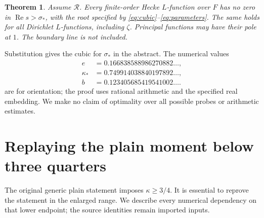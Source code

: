 \documentclass[11pt,a4paper]{article}
\newtheorem{theorem}{Theorem}[section]
\theoremstyle{definition}
\newcommand{\Rea}{\operatorname{Re}}
\newcommand{\sig}{\sigma_*}
\begin{document}
\begin{theorem}\label{thm:main}
Assume $\mathcal R$. Every finite-order Hecke $L$-function over $F$
has no zero in $\Rea s>\sig$, with the root specified by
\eqref{eq:cubic}--\eqref{eq:parameters}.
The same holds for all Dirichlet $L$-functions, including $\zeta$.
Principal functions may have their pole at $1$.
The boundary line is not included.
\end{theorem}

Substitution gives the cubic for $\sig$ in the abstract.
The numerical values
\[
\begin{aligned}
 e&=0.166838588986270882\ldots,\\
 \kappa_*&=0.749914038840197892\ldots,\\
 b&=0.123405685419541002\ldots .
\end{aligned}
\]
are for orientation; the proof uses rational arithmetic and
the specified real embedding. We make no claim of optimality
over all possible probes or arithmetic estimates.

\section{Replaying the plain moment below three quarters}
\label{sec:plain}
The original generic plain statement imposes $\kappa\ge3/4$.
It is essential to reprove the statement in the enlarged range.
We describe every numerical dependency on that lower endpoint;
the source identities remain imported inputs.
\end{document}
